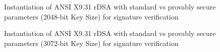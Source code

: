 \documentclass[]{final_report}
\theoremstyle{definition}
\begin{document}
\begin{figure}[H]
    \centering %
     \caption{Instantiation of ANSI X9.31 rDSA with standard vs provably secure parameters (2048-bit Key Size) for signature verification}
    \begin{minipage}{\textwidth}
        \centering
    \end{minipage}
           \label{ansi_verify_2048bit_table}
  \end{figure}
  
\begin{figure}[H]
    \centering %
     \caption{Instantiation of ANSI X9.31 rDSA with standard vs provably secure parameters (3072-bit Key Size) for signature verification}
    \begin{minipage}{\textwidth}
        \centering
    \end{minipage}
          \label{ansi_verify_3072bit_table}
\end{figure}
\end{document}
